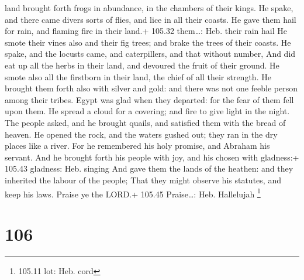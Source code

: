 land brought forth frogs in abundance, in the chambers of their kings.
 He spake, and there came divers sorts of flies, and lice
in all their coasts.  He gave them hail for rain, and
flaming fire in their land.+ 105.32 them\ldots: Heb. their rain hail
 He smote their vines also and their fig trees; and brake
the trees of their coasts.  He spake, and the locusts came,
and caterpillers, and that without number,  And did eat up
all the herbs in their land, and devoured the fruit of their ground.
 He smote also all the firstborn in their land, the chief
of all their strength.  He brought them forth also with
silver and gold: and there was not one feeble person among their tribes.
 Egypt was glad when they departed: for the fear of them
fell upon them.  He spread a cloud for a covering; and fire
to give light in the night.  The people asked, and he
brought quails, and satisfied them with the bread of heaven.
 He opened the rock, and the waters gushed out; they ran in
the dry places like a river.  For he remembered his holy
promise, and Abraham his servant.  And he brought forth his
people with joy, and his chosen with gladness:+ 105.43 gladness: Heb.
singing  And gave them the lands of the heathen: and they
inherited the labour of the people;  That they might
observe his statutes, and keep his laws. Praise ye the LORD.+ 105.45
Praise\ldots: Heb. Hallelujah \footnote{105.11 lot: Heb. cord}

\hypertarget{section-105}{%
\section{106}\label{section-105}}

